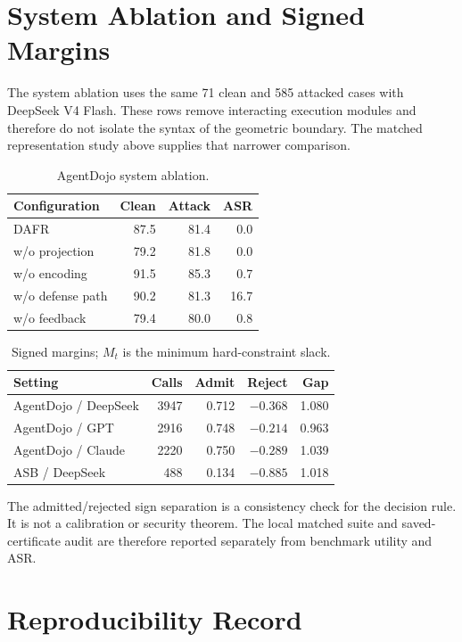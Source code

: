 \documentclass[11pt]{article}
\begin{document}
\section{System Ablation and Signed Margins}

The system ablation uses the same 71 clean and 585 attacked cases with DeepSeek V4 Flash. These rows remove interacting execution modules and therefore do not isolate the syntax of the geometric boundary. The matched representation study above supplies that narrower comparison.

\begin{table}[ht]
\centering\scriptsize
\begin{tabular}{lrrr}
\toprule
Configuration & Clean & Attack & ASR\\
\midrule
DAFR & 87.5 & 81.4 & 0.0\\
w/o projection & 79.2 & 81.8 & 0.0\\
w/o encoding & 91.5 & 85.3 & 0.7\\
w/o defense path & 90.2 & 81.3 & 16.7\\
w/o feedback & 79.4 & 80.0 & 0.8\\
\bottomrule
\end{tabular}
\caption{AgentDojo system ablation.}
\label{tab:ablation-full}
\end{table}

\begin{table}[ht]
\centering\scriptsize
\setlength{\tabcolsep}{2pt}
\begin{tabular}{lrrrr}
\toprule
Setting & Calls & Admit & Reject & Gap\\
\midrule
AgentDojo / DeepSeek & 3947 & 0.712 & $-0.368$ & 1.080\\
AgentDojo / GPT & 2916 & 0.748 & $-0.214$ & 0.963\\
AgentDojo / Claude & 2220 & 0.750 & $-0.289$ & 1.039\\
ASB / DeepSeek & 488 & 0.134 & $-0.885$ & 1.018\\
\bottomrule
\end{tabular}
\caption{Signed margins; $M_t$ is the minimum hard-constraint slack.}
\label{tab:margin-full}
\end{table}

The admitted/rejected sign separation is a consistency check for the decision rule. It is not a calibration or security theorem. The local matched suite and saved-certificate audit are therefore reported separately from benchmark utility and ASR.

\section{Reproducibility Record}
\end{document}

